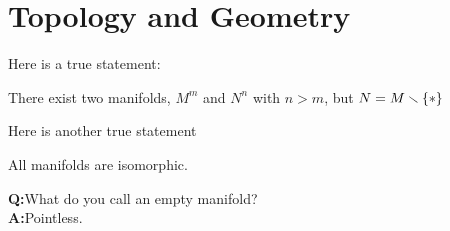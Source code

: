 \setcounter{section}{0}

\section{Topology and Geometry}
Here is a true statement:
\begin{center}
  There exist two manifolds, $M^m$ and $N^n$ with $n>m$, 
  but $N = M\smallsetminus \{\ast\}$
\end{center}
Here is another true statement
\begin{center}
  All manifolds are isomorphic.
\end{center}

\textbf{Q:}What do you call an empty manifold?\\
\textbf{A:}Pointless.
